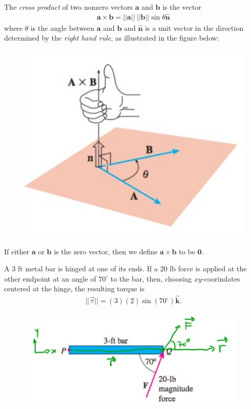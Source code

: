 \documentclass[12pt,letterpaper,reqno]{article}
\numberwithin{equation}{section}
\begin{document}
\begin{defn}
	The \emph{cross product} of two nonzero vectors $\mathbf{a}$ and $\mathbf{b}$ is the vector
	\begin{align*}
		\mathbf{a} \times \mathbf{b}=||\mathbf{a}|| \ ||\mathbf{b}||\sin\theta \mathbf{\hat{n}}
	\end{align*}
	where $\theta$ is the angle between $\mathbf{a}$ and $\mathbf{b}$ and $\mathbf{\hat{n}}$ is a unit vector in the direction determined by the \emph{right hand rule}, as illustrated in the figure below:
	\begin{figure}[h]
		\begin{center}
			\includegraphics[scale=0.3]{figures_mvc/rhrule}
		\end{center}
	\end{figure}
	
	If either $\mathbf{a}$ or $\mathbf{b}$ is the zero vector, then we define $\mathbf{a} \times \mathbf{b}$ to be $\mathbf{0}$.
\end{defn}

\begin{example}
A 3 ft metal bar is hinged at one of its ends. If a 20 lb force is applied at the other endpoint at an angle of $70^\circ$ to the bar, then, choosing $xy$-coorindates centered at the hinge, the resulting torque is 
\begin{align*}
	||\vec{\tau}||=(3)(2)\sin(70^\circ)\mathbf{\hat{k}}.
\end{align*}
\begin{figure}[h]
	\begin{center}
		\includegraphics[scale=0.5]{figures_mvc/torque_example_bar}
	\end{center}
\end{figure}	
\end{example}
\end{document}
